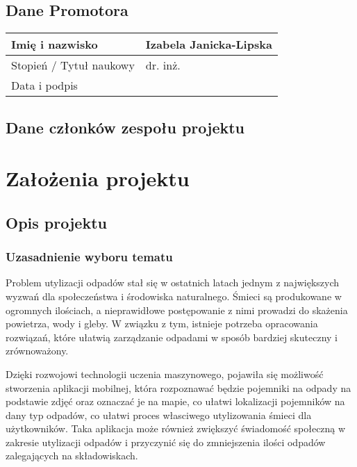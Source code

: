 \documentclass[12pt,oneside]{book}
\begin{document}
\section{Dane Promotora}

\begin{tabular}{ |p{5cm}|p{9cm}|}
    \hline
    Imię i nazwisko & Izabela Janicka-Lipska \\
    \hline
    Stopień / Tytuł naukowy & dr. inż. \\
    \hline
    Data i podpis &  \\ \hline
\end{tabular}


\pagestyle{plain}

\section{Dane członków zespołu projektu}

\membersTable

{\let\clearpage\relax
    \chapter{Założenia projektu}
    }

\section{Opis projektu}

\subsection{Uzasadnienie wyboru tematu}

Problem utylizacji odpadów stał się w ostatnich latach jednym z największych wyzwań dla społeczeństwa i środowiska naturalnego. Śmieci są produkowane w ogromnych ilościach, a nieprawidłowe postępowanie z nimi prowadzi do skażenia powietrza, wody i gleby. W związku z tym, istnieje potrzeba opracowania rozwiązań, które ułatwią zarządzanie odpadami w sposób bardziej skuteczny i zrównoważony.

Dzięki rozwojowi technologii uczenia maszynowego, pojawiła się możliwość stworzenia aplikacji mobilnej, która rozpoznawać będzie pojemniki na odpady na podstawie zdjęć oraz oznaczać je na mapie, co ułatwi lokalizacji pojemników na dany typ odpadów, co ułatwi proces własciwego utylizowania śmieci dla użytkowników. Taka aplikacja może również zwiększyć świadomość społeczną w zakresie utylizacji odpadów i przyczynić się do zmniejszenia ilości odpadów zalegających na składowiskach.
\end{document}

